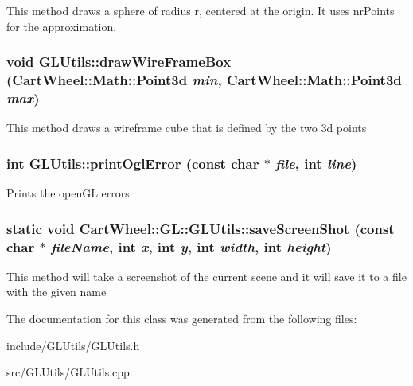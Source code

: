 \label{classCartWheel_1_1GL_1_1GLUtils_a57e1b070853a240d42fd158c0865ec34}
This method draws a sphere of radius r, centered at the origin. It uses nrPoints for the approximation. \hypertarget{classCartWheel_1_1GL_1_1GLUtils_aaa7dcd583875247aad79c8f77e076387}{
\subsubsection[{drawWireFrameBox}]{\setlength{\rightskip}{0pt plus 5cm}void GLUtils::drawWireFrameBox ({\bf CartWheel::Math::Point3d} {\em min}, \/  {\bf CartWheel::Math::Point3d} {\em max})}}
\label{classCartWheel_1_1GL_1_1GLUtils_aaa7dcd583875247aad79c8f77e076387}
This method draws a wireframe cube that is defined by the two 3d points \hypertarget{classCartWheel_1_1GL_1_1GLUtils_a1f9f9aac7039f03ceff1337f5b91c280}{
\subsubsection[{printOglError}]{\setlength{\rightskip}{0pt plus 5cm}int GLUtils::printOglError (const char $\ast$ {\em file}, \/  int {\em line})}}
\label{classCartWheel_1_1GL_1_1GLUtils_a1f9f9aac7039f03ceff1337f5b91c280}
Prints the openGL errors \hypertarget{classCartWheel_1_1GL_1_1GLUtils_a8a4d9bd5a7caa9038105119062162c5f}{
\subsubsection[{saveScreenShot}]{\setlength{\rightskip}{0pt plus 5cm}static void CartWheel::GL::GLUtils::saveScreenShot (const char $\ast$ {\em fileName}, \/  int {\em x}, \/  int {\em y}, \/  int {\em width}, \/  int {\em height})}}
\label{classCartWheel_1_1GL_1_1GLUtils_a8a4d9bd5a7caa9038105119062162c5f}
This method will take a screenshot of the current scene and it will save it to a file with the given name 

The documentation for this class was generated from the following files:\begin{DoxyCompactItemize}
\item 
include/GLUtils/GLUtils.h\item 
src/GLUtils/GLUtils.cpp\end{DoxyCompactItemize}
